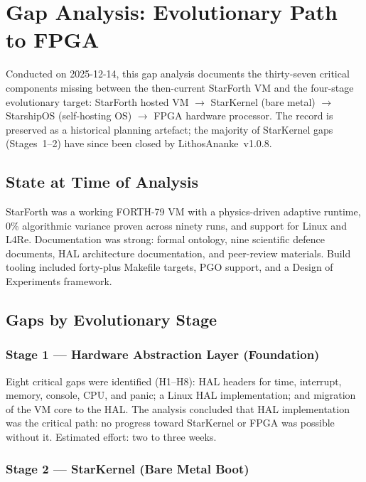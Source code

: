 
\section{Gap Analysis: Evolutionary Path to FPGA}

Conducted on 2025-12-14, this gap analysis documents the thirty-seven
critical components missing between the then-current StarForth VM and the
four-stage evolutionary target: StarForth hosted VM $\to$ StarKernel
(bare metal) $\to$ StarshipOS (self-hosting OS) $\to$ FPGA hardware
processor. The record is preserved as a historical planning artefact;
the majority of StarKernel gaps (Stages~1--2) have since been closed by
LithosAnanke~v1.0.8.

\subsection{State at Time of Analysis}

StarForth was a working FORTH-79 VM with a physics-driven adaptive runtime,
0\% algorithmic variance proven across ninety runs, and support for Linux
and L4Re. Documentation was strong: formal ontology, nine scientific
defence documents, HAL architecture documentation, and peer-review
materials. Build tooling included forty-plus Makefile targets, PGO
support, and a Design of Experiments framework.

\subsection{Gaps by Evolutionary Stage}

\subsubsection{Stage 1 — Hardware Abstraction Layer (Foundation)}

Eight critical gaps were identified (H1--H8): HAL headers for time,
interrupt, memory, console, CPU, and panic; a Linux HAL implementation;
and migration of the VM core to the HAL. The analysis concluded that
HAL implementation was the critical path: no progress toward StarKernel
or FPGA was possible without it. Estimated effort: two to three weeks.

\subsubsection{Stage 2 — StarKernel (Bare Metal Boot)}

